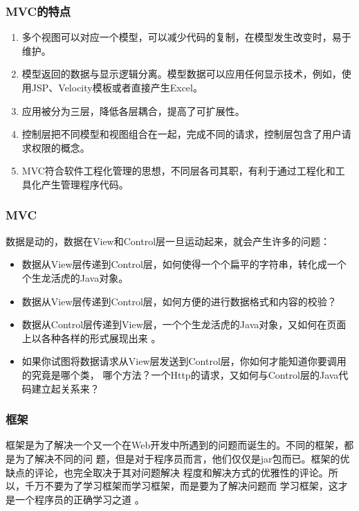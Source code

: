 \begin{frame}[fragile] %
\frametitle{MVC的特点}\kai
\begin{enumerate}
\item 多个视图可以对应一个模型，可以减少代码的复制，在模型发生改变时，易于维护。
\item 模型返回的数据与显示逻辑分离。模型数据可以应用任何显示技术，例如，使用JSP、Velocity模板或者直接产生Excel。
\item 应用被分为三层，降低各层耦合，提高了可扩展性。
\item 控制层把不同模型和视图组合在一起，完成不同的请求，控制层包含了用户请求权限的概念。
\item MVC符合软件工程化管理的思想，不同层各司其职，有利于通过工程化和工具化产生管理程序代码。
\end{enumerate}
\end{frame}

\begin{frame}[fragile] %
\frametitle{MVC}

数据是动的，数据在View和Control层一旦运动起来，就会产生许多的问题：
\begin{itemize}[<+-| alert@+>]\kai\small
\item 数据从View层传递到Control层，如何使得一个个扁平的字符串，转化成一个个生龙活虎的Java对象。
\item 数据从View层传递到Control层，如何方便的进行数据格式和内容的校验？ 
\item 数据从Control层传递到View层，一个个生龙活虎的Java对象，又如何在页面上以各种各样的形式展现出来 。
\item 如果你试图将数据请求从View层发送到Control层，你如何才能知道你要调用的究竟是哪个类，
  哪个方法？一个Http的请求，又如何与Control层的Java代码建立起关系来？
\end{itemize}
\end{frame}

\begin{frame}[fragile] %
\frametitle{框架}

框架是为了解决一个又一个在Web开发中所遇到的问题而诞生的。不同的框架，都是为了解决不同的问
题，但是对于程序员而言，他们仅仅是jar包而已。框架的优缺点的评论，也完全取决于其对问题解决
程度和解决方式的优雅性的评论。所以，{\hei\Blue 千万不要为了学习框架而学习框架，而是要为了解决问题而
学习框架，这才是一个程序员的正确学习之道 。}
\end{frame}

